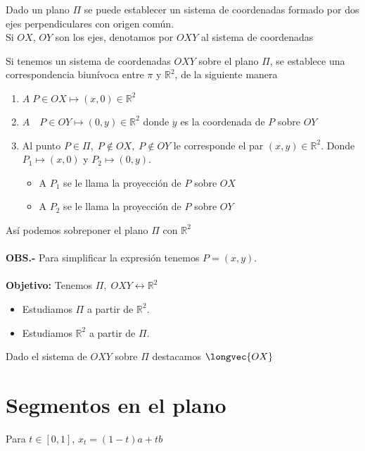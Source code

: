 
\begin{def.}
    Dado un plano $\Pi$ se puede establecer un sistema de coordenadas formado por dos ejes perpendiculares con origen común.\\
    Si $OX$, $OY$ son los ejes, denotamos por $OXY$ al sistema de coordenadas
    \begin{center}
    \end{center}
\end{def.}

\begin{def.}
    Si tenemos un sistema de coordenadas $OXY$ sobre el plano $\Pi$, se establece una correspondencia biunívoca entre $\pi$ y $\mathbb{R}^2$, de la siguiente manera
    \begin{enumerate}[\bfseries (1)]
	\item $A\; P\in OX \longmapsto (x,0)\in \mathbb{R}^2$
	\item $A\quad P\in OY \longmapsto (0,y)\in \mathbb{R}^2$ donde $y$ es la coordenada de $P$ sobre $OY$
	\item Al punto $P\in \Pi,\; P\notin OX,\; P\notin OY$ le corresponde el par $(x,y)\in \mathbb{R}^2$. Donde $P_1 \longmapsto (x,0)$ y $P_2 \longmapsto (0,y)$.\\
	    \begin{itemize}
		\item A $P_1$ se le llama la proyección de $P$ sobre $OX$
		\item A $P_2$ se le llama la proyección de $P$ sobre $OY$
	    \end{itemize}
    \end{enumerate}
\end{def.}

Así podemos sobreponer el plano $\Pi$ con $\mathbb{R}^2$\\\\

\textbf{OBS.-} Para simplificar la expresión tenemos $P=(x,y)$.\\\\

\textbf{Objetivo:} Tenemos $\Pi,\; OXY \longleftrightarrow \mathbb{R}^2$
\begin{itemize}
    \item Estudiamos $\Pi$ a partir de $\mathbb{R}^2$.
    \item Estudiamos $\mathbb{R}^2$ a partir de $\Pi$.
\end{itemize}

\begin{def.}[Ángulos]
    Dado el sistema de $OXY$ sobre $\Pi$ destacamos $\longvec{OX}$
\end{def.}


\chapter{Segmentos en el plano}

Para $t\in [0,1]$, $x_t = (1-t)a+tb$
